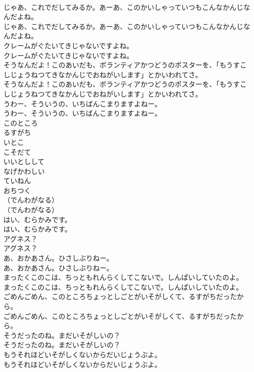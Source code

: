 \documentclass[8pt]{extreport}
\begin{document}
\begin{CJK}{UTF8}{min}
\\	じゃあ、これでだしてみるか。あーあ、このかいしゃっていつもこんなかんじなんだよね。
\\	じゃあ、これでだしてみるか。あーあ、このかいしゃっていつもこんなかんじなんだよね。
\\	クレームがぐたいてきじゃないですよね。
\\	クレームがぐたいてきじゃないですよね。
\\	そうなんだよ！このあいだも、ボランティアかつどうのポスターを、「もうすこしじょうねつてきなかんじでおねがいします」とかいわれてさ。
\\	そうなんだよ！このあいだも、ボランティアかつどうのポスターを、「もうすこしじょうねつてきなかんじでおねがいします」とかいわれてさ。
\\	うわー、そういうの、いちばんこまりますよねー。
\\	うわー、そういうの、いちばんこまりますよねー。
\\	このところ
\\	るすがち
\\	いとこ
\\	こそだて
\\	いいとしして
\\	なげかわしい
\\	ていねん
\\	おちつく
\\	（でんわがなる）
\\	（でんわがなる）
\\	はい、むらかみです。
\\	はい、むらかみです。
\\	アグネス？
\\	アグネス？
\\	あ、おかあさん。ひさしぶりねー。
\\	あ、おかあさん。ひさしぶりねー。
\\	まったくこのこは、ちっともれんらくしてこないで。しんぱいしていたのよ。
\\	まったくこのこは、ちっともれんらくしてこないで。しんぱいしていたのよ。
\\	ごめんごめん、このところちょっとしごとがいそがしくて、るすがちだったから。
\\	ごめんごめん、このところちょっとしごとがいそがしくて、るすがちだったから。
\\	そうだったのね。まだいそがしいの？
\\	そうだったのね。まだいそがしいの？
\\	もうそれほどいそがしくないからだいじょうぶよ。
\\	もうそれほどいそがしくないからだいじょうぶよ。

\end{CJK}
\end{document}
